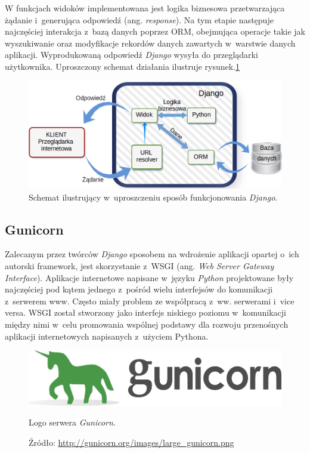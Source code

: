 \documentclass[a4paper,12pt,oneside]{mwrep}  %
\begin{document}
W funkcjach widoków implementowana jest logika biznesowa przetwarzająca żądanie i~generująca odpowiedź (ang. \emph{response}). Na tym etapie następuje najczęściej interakcja z~bazą danych poprzez ORM, obejmująca operacje takie jak wyszukiwanie oraz modyfikacje rekordów danych zawartych w~warstwie danych aplikacji. Wyprodukowaną odpowiedź \emph{Django} wysyła do przeglądarki użytkownika. Uproszczony schemat działania ilustruje rysunek.\ref{schemat_django}

\begin{figure}[h]
\centering
\includegraphics[width=1\textwidth]{grafika/schemat_django.png}
\caption{Schemat ilustrujący w~uproszczeniu sposób funkcjonowania \emph{Django}.}
\label{schemat_django}
\end{figure}

\subsection{Gunicorn}
Zalecanym przez twórców \emph{Django} sposobem na wdrożenie aplikacji opartej o~ich autorski framework, jest skorzystanie z~WSGI (ang. \emph{Web Server Gateway Interface}). Aplikacje internetowe napisane w~języku \emph{Python} projektowane były najczęściej pod kątem jednego z~pośród wielu interfejsów do komunikacji z~serwerem www. Często miały problem ze współpracą z~ww. serwerami i~vice versa. WSGI został stworzony jako interfejs niskiego poziomu w~komunikacji między nimi w~celu promowania wspólnej podstawy dla rozwoju przenośnych aplikacji internetowych napisanych z~użyciem Pythona. %
\begin{figure}[h]
\centering
\includegraphics[width=1\textwidth/(25/10)]{grafika/loga/gunicorn.png}
\caption{Logo serwera \emph{Gunicorn}.}
\vspace{-0.8cm}
\caption*{\scriptsize Źródło: \url{http://gunicorn.org/images/large_gunicorn.png}}
\label{logo_gunicorn}
\end{figure}
\end{document}
